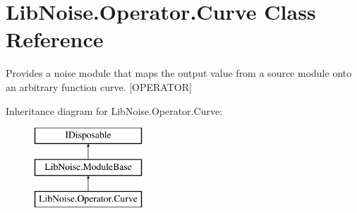 \hypertarget{class_lib_noise_1_1_operator_1_1_curve}{}\section{Lib\+Noise.\+Operator.\+Curve Class Reference}
\label{class_lib_noise_1_1_operator_1_1_curve}


Provides a noise module that maps the output value from a source module onto an arbitrary function curve. \mbox{[}O\+P\+E\+R\+A\+T\+OR\mbox{]}  


Inheritance diagram for Lib\+Noise.\+Operator.\+Curve\+:\begin{figure}[H]
\begin{center}
\leavevmode
\includegraphics[height=3.000000cm]{class_lib_noise_1_1_operator_1_1_curve}
\end{center}
\end{figure}
